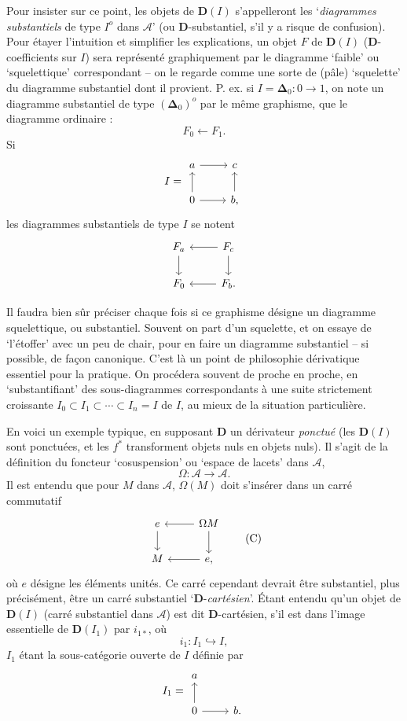 \documentclass[11pt]{article}
\newcommand{\printedpage}[1]{\marginpar{\footnotesize p.~#1}}
\newcommand{\msp}[1]{\marginpar{\footnotesize [#1]}}
\newcommand{\D}{\mathbf{D}}
\newcommand{\cA}{\mathcal{A}}
\newcommand{\bDelta}{\boldsymbol{\Delta}}
\begin{document}
Pour insister sur ce point, les objets de $\D(I)$ s'appelleront les `\textit{diagrammes substantiels} de type $I^o$ dans $\cA$' (ou $\D$-substantiel, s'il y a risque de confusion). Pour étayer l'intuition et simplifier les explications, un objet $F$ de $\D(I)$ ($\D$-coefficients sur $I$) sera représenté graphiquement par le diagramme `faible' ou `squelettique' correspondant -- on le regarde
\msp{page 74}
comme une sorte de (pâle) `squelette' du diagramme substantiel dont il provient. P. ex. si $I=\bDelta_0 : 0\longrightarrow 1$, on note un diagramme substantiel de type $(\bDelta_0)^o$ par le même graphisme, que le diagramme ordinaire :
\[
F_0 \longleftarrow F_1.
\]
Si
\[
I = \begin{tikzcd}
a \arrow[r] & c \\
0 \arrow[u] \arrow[r] & b, \arrow[u]
\end{tikzcd}
\]
les diagrammes substantiels de type $I$ se notent
\[
\begin{tikzcd}
F_a \arrow[d] & F_c \arrow[l] \arrow[d] \\
F_0 & F_b. \arrow[l]
\end{tikzcd}
\]

\clearpage

\printedpage{2}

Il faudra bien sûr préciser chaque fois si ce graphisme désigne un diagramme squelettique, ou substantiel. Souvent on part d'un squelette, et on essaye de `l'étoffer' avec un peu de chair, pour en faire un diagramme substantiel -- si possible, de façon canonique. C'est là un point de philosophie dérivatique essentiel pour la pratique. On procédera souvent de proche en proche, en `substantifiant' des sous-diagrammes correspondants à une suite strictement croissante $I_0\subset I_1\subset\cdots\subset I_n=I$ de $I$, au mieux de la situation particulière.

\msp{page 75}

En voici un exemple typique, en supposant $\D$ un dérivateur \textit{ponctué} (les $\D(I)$ sont ponctuées, et les $f^*$ transforment objets nuls en objets nuls). Il s'agit de la définition du foncteur `cosuspension' ou `espace de lacets' dans $\cA$,
\[
\Omega : \cA \longrightarrow \cA.
\]
Il est entendu que pour $M$ dans $\cA$, $\Omega(M)$ doit s'insérer dans un carré commutatif
\[
\begin{tikzcd}
e \arrow[d] & \Omega M \arrow[l] \arrow[d] \\
M & e, \arrow[l]
\end{tikzcd}
\tag*{(C)}
\]
où $e$ désigne les éléments unités. Ce carré cependant devrait être substantiel, plus précisément, être un carré substantiel `$\D$-\textit{cartésien}'. Étant entendu qu'un objet de $\D(I)$ (carré substantiel dans $\cA$) est dit $\D$-cartésien, s'il est dans l'image essentielle de $\D(I_1)$ par $i_{1*}$, où
\[
i_1 : I_1 \hookrightarrow I,
\]
$I_1$ étant la sous-catégorie ouverte de $I$ définie par
\[
I_1 = \begin{tikzcd}
a \\
0 \arrow[u] \arrow[r] & b.
\end{tikzcd}
\]
\end{document}
